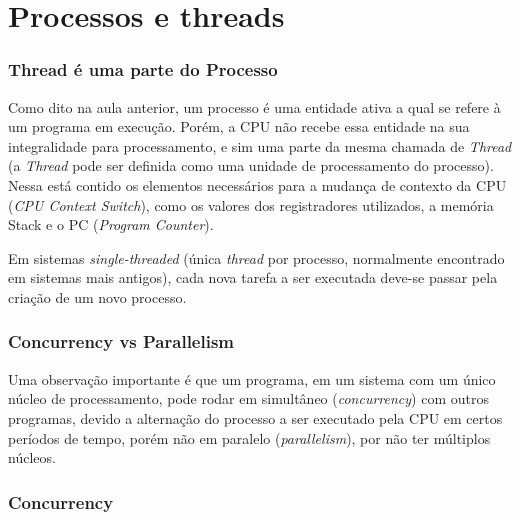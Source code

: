 




\hypertarget{processos-e-threads}{%
\chapter{Processos e threads}\label{processos-e-threads}}

\hypertarget{thread-uxe9-uma-parte-do-processo}{%
\subsection{Thread é uma parte do Processo}\label{thread-uxe9-uma-parte-do-processo}}

Como dito na aula anterior, um processo é uma entidade ativa a qual se
refere à um programa em execução. Porém, a CPU não recebe essa entidade
na sua integralidade para processamento, e sim uma parte da mesma
chamada de \emph{Thread} (a \emph{Thread} pode ser definida como uma
unidade de processamento do processo). Nessa está contido os elementos
necessários para a mudança de contexto da CPU (\emph{CPU Context
Switch}), como os valores dos registradores utilizados, a memória Stack
e o PC (\emph{Program Counter}).

Em sistemas \emph{single-threaded} (única \emph{thread} por processo,
normalmente encontrado em sistemas mais antigos), cada nova tarefa a ser
executada deve-se passar pela criação de um novo processo.

\hypertarget{concurrency-vs-parallelism}{%
\subsection{Concurrency vs Parallelism}\label{concurrency-vs-parallelism}}

Uma observação importante é que um programa, em um sistema com um único
núcleo de processamento, pode rodar em simultâneo (\emph{concurrency})
com outros programas, devido a alternação do processo a ser executado
pela CPU em certos períodos de tempo, porém não em paralelo
(\emph{parallelism}), por não ter múltiplos núcleos.

\hypertarget{concurrency}{%
\subsection{Concurrency}\label{concurrency}}

